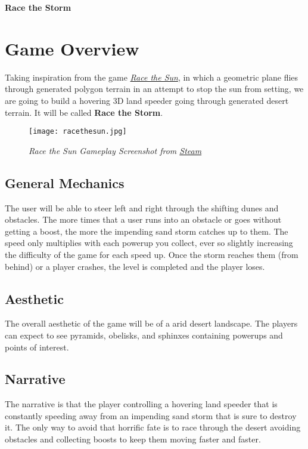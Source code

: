 \documentclass[11pt]{article}
\begin{document}
\begin{center}
	\LARGE \textbf{Race the Storm}
\end{center}

\section*{Game Overview}
Taking inspiration from the game \href{https://store.steampowered.com/app/253030/Race_The_Sun/}{\textit{Race the Sun}},
in which a geometric plane flies through generated polygon terrain in an attempt to stop the sun from setting, we are going to build a hovering 3D land speeder going through generated desert terrain.
It will be called \textbf{Race the Storm}.

\begin{figure}[h]
	\begin{center}
		\texttt{[image: racethesun.jpg]}
	\end{center}
	\caption{\textit{Race the Sun Gameplay Screenshot from \href{https://store.steampowered.com/app/253030/Race_The_Sun/}{Steam}}}
	\label{fig:racethesun}
\end{figure}

\subsection*{General Mechanics}
The user will be able to steer left and right through the shifting dunes and obstacles.
The more times that a user runs into an obstacle or goes without getting a boost, the more the impending sand storm catches up to them.
The speed only multiplies with each powerup you collect, ever so slightly increasing the difficulty of the game for each speed up.
Once the storm reaches them (from behind) or a player crashes, the level is completed and the player loses.

\subsection*{Aesthetic}
The overall aesthetic of the game will be of a arid desert landscape.
The players can expect to see pyramids, obelisks, and sphinxes containing powerups and points of interest.

\subsection*{Narrative}
The narrative is that the player controlling a hovering land speeder that is constantly speeding away from an impending sand storm that is sure to destroy it.
The only way to avoid that horrific fate is to race through the desert avoiding obstacles and collecting boosts to keep them moving faster and faster.
\end{document}
